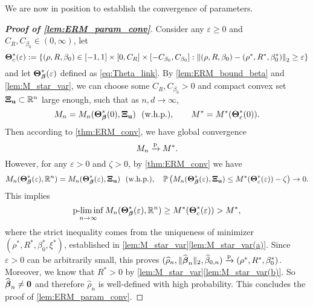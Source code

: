 We are now in position to establish the convergence of parameters.
\begin{proof}[\textbf{Proof of \cref{lem:ERM_param_conv}}]
Consider any $\varepsilon \ge 0$ and $C_R, C_{\beta_0} \in (0, \infty)$, let
\begin{equation*}
    \text{\boldmath $\Theta$}_{c}^*(\varepsilon) := \left\{ (\rho, R, \beta_0) \in [-1, 1] \times [0, C_R] \times [-C_{\beta_0}, C_{\beta_0}] : 
    \left\|{ (\rho, R, \beta_0) - (\rho^*, R^*, \beta_0^*) }\right\|_2 \ge \varepsilon
    \right\}
\end{equation*}
and let $\text{\boldmath $\Theta$}^*_{{\boldsymbol{\beta}}}(\varepsilon)$ defined as \cref{eq:Theta_link}. By \cref{lem:ERM_bound_beta} and \ref{lem:M_star_var}, we can choose some $C_R, C_{\beta_0} > 0$ and compact convex set $\text{\boldmath $\Xi$}_{\mathrm{\bf u}} \subset \mathbb{R}^{n}$ large enough, such that as $n, d \to \infty$,
\begin{equation*}
    M_n =
    M_n(\text{\boldmath $\Theta$}^*_{{\boldsymbol{\beta}}}(0), \text{\boldmath $\Xi$}_{\mathrm{\bf u}}) \ \ (\text{w.h.p.}) ,
    \qquad
    M^* =
    M^*(\text{\boldmath $\Theta$}^*_{c}(0)).
\end{equation*}
Then according to \cref{thm:ERM_conv}, we have global convergence
\begin{equation*}
    M_n \xrightarrow{\mathrm{p}} M^*.
\end{equation*}
However, for any $\varepsilon > 0$ and $\zeta > 0$, by \cref{thm:ERM_conv} we have
\begin{equation*}
    M_n(\text{\boldmath $\Theta$}^*_{{\boldsymbol{\beta}}}(\varepsilon), \mathbb{R}^n) =
    M_n(\text{\boldmath $\Theta$}^*_{{\boldsymbol{\beta}}}(\varepsilon), \text{\boldmath $\Xi$}_{\mathrm{\bf u}}) \ \ (\text{w.h.p.}) ,
    \quad
    \mathbb{P} \left( M_n(\text{\boldmath $\Theta$}^*_{{\boldsymbol{\beta}}}(\varepsilon), \text{\boldmath $\Xi$}_{\mathrm{\bf u}}) \le M^*(\text{\boldmath $\Theta$}_{c}^*(\varepsilon)) - \zeta \right) \to 0.
\end{equation*}
This implies
\begin{equation*}
    \operatorname*{p-lim\, inf}_{n \to \infty} M_n(\text{\boldmath $\Theta$}^*_{{\boldsymbol{\beta}}}(\varepsilon), \mathbb{R}^n) \ge
    M^*(\text{\boldmath $\Theta$}_{c}^*(\varepsilon))
    >
    M^*,
\end{equation*}
where the strict inequality comes from the uniqueness of minimizer $(\rho^*, R^*, \beta_0^*, \xi^*)$, established in \cref{lem:M_star_var}\ref{lem:M_star_var(a)}. Since $\varepsilon > 0$ can be arbitrarily small, this proves $(\widehat\rho_n, \| \widehat{{\boldsymbol{\beta}}}_n \|_2, \widehat\beta_{0,n}) \xrightarrow{\mathrm{p}} (\rho^*, R^*, \beta_0^*)$. Moreover, we know that $R^* > 0$ by \cref{lem:M_star_var}\ref{lem:M_star_var(b)}. So $\widehat{{\boldsymbol{\beta}}}_n \not= \mathrm{\bf 0}$ and therefore $\hat\rho_n$ is well-defined with high probability. This concludes the proof of \cref{lem:ERM_param_conv}.
\end{proof}



